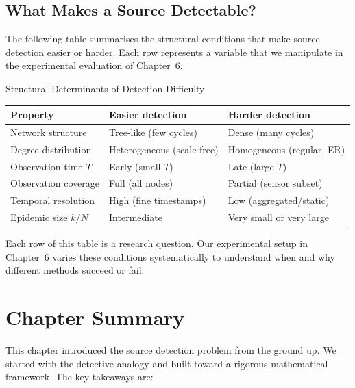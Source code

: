 \subsection{What Makes a Source Detectable?}

The following table summarises the structural conditions that make source
detection easier or harder. Each row represents a variable that we
manipulate in the experimental evaluation of Chapter~6.

\begin{conceptbox}{Structural Determinants of Detection Difficulty}
\begin{center}
\renewcommand{\arraystretch}{1.3}
\begin{tabular}{lll}
\toprule
\textbf{Property} & \textbf{Easier detection} & \textbf{Harder detection} \\
\midrule
Network structure     & Tree-like (few cycles)       & Dense (many cycles)        \\
Degree distribution   & Heterogeneous (scale-free)   & Homogeneous (regular, ER)  \\
Observation time $T$  & Early (small $T$)            & Late (large $T$)           \\
Observation coverage  & Full (all nodes)             & Partial (sensor subset)    \\
Temporal resolution   & High (fine timestamps)       & Low (aggregated/static)    \\
Epidemic size $k/N$   & Intermediate                 & Very small or very large   \\
\bottomrule
\end{tabular}
\end{center}
\end{conceptbox}

Each row of this table is a research question. Our experimental setup in
Chapter~6 varies these conditions systematically to understand when and why
different methods succeed or fail.

\section{Chapter Summary}
\label{sec:source-detection-summary}

This chapter introduced the source detection problem from the ground up. We
started with the detective analogy and built toward a rigorous mathematical
framework. The key takeaways are:

